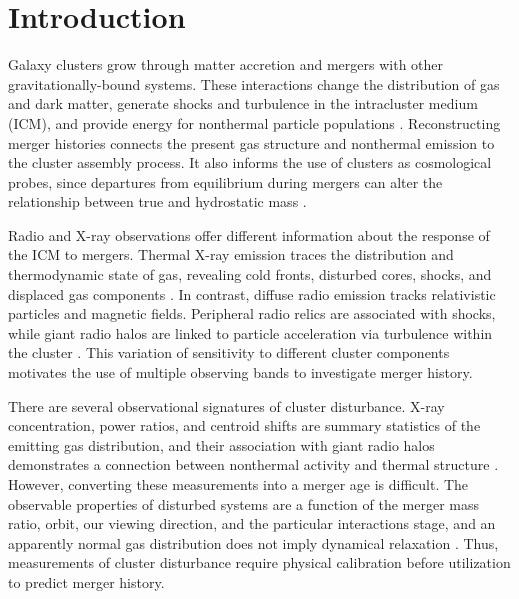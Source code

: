 \section{Introduction}
\label{sec:intro}

Galaxy clusters grow through matter accretion and mergers with other gravitationally-bound systems.
These interactions change the distribution of gas and dark matter, generate shocks and turbulence in the intracluster medium (ICM), and provide energy for nonthermal particle populations \citep{KravtsovBorgani2012, Sarazin2002}.
Reconstructing merger histories connects the present gas structure and nonthermal emission to the cluster assembly process.
It also informs the use of clusters as cosmological probes, since departures from equilibrium during mergers can alter the relationship between true and hydrostatic mass \citep{Gianfagna2023}.

Radio and X-ray observations offer different information about the response of the ICM to mergers.
Thermal X-ray emission traces the distribution and thermodynamic state of gas, revealing cold fronts, disturbed cores, shocks, and displaced gas components \citep{MarkevitchVikhlinin2007}.
In contrast, diffuse radio emission tracks relativistic particles and magnetic fields.
Peripheral radio relics are associated with shocks, while giant radio halos are linked to particle acceleration via turbulence within the cluster \citep{BrunettiJones2014, vanWeeren2019}.
This variation of sensitivity to different cluster components motivates the use of multiple observing bands to investigate merger history.

There are several observational signatures of cluster disturbance.
X-ray concentration, power ratios, and centroid shifts are summary statistics of the emitting gas distribution, and their association with giant radio halos demonstrates a connection between nonthermal activity and thermal structure \citep{Cassano2010}.
However, converting these measurements into a merger age is difficult.
The observable properties of disturbed systems are a function of the merger mass ratio, orbit, our viewing direction, and the particular interactions stage, and an apparently normal gas distribution does not imply dynamical relaxation \citep{Poole2006}.
Thus, measurements of cluster disturbance require physical calibration before utilization to predict merger history.

